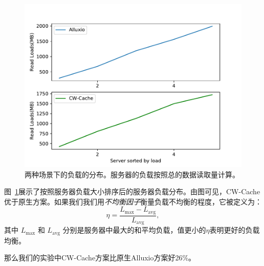 \begin{figure}[ht]
	\centering
	\includegraphics[width=0.70\paperwidth]{img/evaluation/server-load}
	\caption{两种场景下的负载的分布。服务器的负载按照总的数据读取量计算。}
	\label{fig:server-load}
\end{figure}

\par 图~\ref{fig:server-load}展示了按照服务器负载大小排序后的服务器负载分布。由图可见，CW-Cache优于原生方案。如果我们我们用\emph{不均衡因子}衡量负载不均衡的程度，它被定义为：
\begin{equation}
    \textstyle \eta = \frac{L_{\mathrm{max}}-L_{\mathrm{avg}}}{L_{\mathrm{avg}}},
\end{equation}
其中 $L_{\mathrm{max}}$ 和 $L_{\mathrm{avg}}$ 分别是服务器中最大的和平均负载，值更小的$\eta$表明更好的负载均衡。

\par 那么我们的实验中CW-Cache方案比原生Alluxio方案好26\%。

